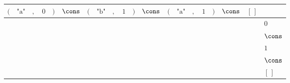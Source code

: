 {\scriptsize\setlength{\tabcolsep}{1.5pt}%
\begin{tabular}{ccccccccccccccccccc|l}
$($ & $\text{"a"}$ & $,$ & $\text{0}$ & $)$ & $\cons$ & $($ & $\text{"b"}$ & $,$ & $\text{1}$ & $)$ & $\cons$ & $($ & $\text{"a"}$ & $,$ & $\text{1}$ & $)$ & $\cons$ & $[\,]$ & \\ \hline
\gcell{$$} & \gcell{$\posC{\circ}$} & \gcell{$\posC{\circ}$} & \gcell{$\posD{\bullet}$} & \gcell{$$} & \gcell{$\posC{\circ}$} & \gcell{$$} & \gcell{$$} & \gcell{$$} & \gcell{$$} & \gcell{$$} & \gcell{$$} & \gcell{$$} & \gcell{$$} & \gcell{$$} & \gcell{$$} & \gcell{$$} & \gcell{$$} & \gcell{$$} & $\text{0}$ \\
\gcell{$$} & \gcell{$\posC{\circ}$} & \gcell{$\posC{\circ}$} & \gcell{$$} & \gcell{$$} & \gcell{$\posC{\circ}$} & \gcell{$$} & \gcell{$$} & \gcell{$$} & \gcell{$$} & \gcell{$$} & \gcell{$$} & \gcell{$$} & \gcell{$$} & \gcell{$$} & \gcell{$$} & \gcell{$$} & \gcell{$$} & \gcell{$$} & $\cons$ \\
\gcell{$$} & \gcell{$\posC{\circ}$} & \gcell{$\posC{\circ}$} & \gcell{$$} & \gcell{$$} & \gcell{$\posC{\circ}$} & \gcell{$$} & \gcell{$\posC{\circ}$} & \gcell{$\posC{\circ}$} & \gcell{$$} & \gcell{$$} & \gcell{$\posC{\circ}$} & \gcell{$$} & \gcell{$\posC{\circ}$} & \gcell{$\posC{\circ}$} & \gcell{$\posD{\bullet}$} & \gcell{$$} & \gcell{$\posC{\circ}$} & \gcell{$$} & $\text{1}$ \\
\gcell{$$} & \gcell{$\posC{\circ}$} & \gcell{$\posC{\circ}$} & \gcell{$$} & \gcell{$$} & \gcell{$\posC{\circ}$} & \gcell{$$} & \gcell{$\posC{\circ}$} & \gcell{$\posC{\circ}$} & \gcell{$$} & \gcell{$$} & \gcell{$\posC{\circ}$} & \gcell{$$} & \gcell{$\posC{\circ}$} & \gcell{$\posC{\circ}$} & \gcell{$$} & \gcell{$$} & \gcell{$\posC{\circ}$} & \gcell{$$} & $\cons$ \\
\gcell{$$} & \gcell{$\posC{\circ}$} & \gcell{$\posC{\circ}$} & \gcell{$$} & \gcell{$$} & \gcell{$\posC{\circ}$} & \gcell{$$} & \gcell{$\posC{\circ}$} & \gcell{$\posC{\circ}$} & \gcell{$$} & \gcell{$$} & \gcell{$\posC{\circ}$} & \gcell{$$} & \gcell{$\posC{\circ}$} & \gcell{$\posC{\circ}$} & \gcell{$$} & \gcell{$$} & \gcell{$\posC{\circ}$} & \gcell{$\posC{\circ}$} & $[\,]$ \\
\end{tabular}}
